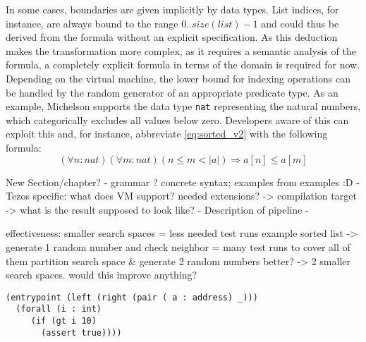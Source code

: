 In some cases, boundaries are given implicitly by data types. List indices, for instance, are always bound to the range $0.. size(list) - 1$ and could thus be derived from the formula without an explicit specification. As this deduction makes the transformation more complex, as it requires a semantic analysis of the formula, a completely explicit formula in terms of the domain is required for now. Depending on the virtual machine, the lower bound for indexing operations can be handled by the random generator of an appropriate predicate type. As an example, Michelson supports the data type \texttt{nat} representing the natural numbers, which categorically excludes all values below zero. Developers aware of this can exploit this and, for instance, abbreviate \eqref{eq:sorted_v2} with the following formula:
\begin{equation}\label{eq:sorted_v2_abbr}
	(\forall n : nat)(\forall m : nat) (n \le m < |a|) \Rightarrow a[n] \leq a[m]
\end{equation}


New Section/chapter? %
- grammar ? concrete syntax; examples from examples :D
- Tezos specific: what does VM support? needed extensions?
	-> compilation target -> what is the result supposed to look like?
- Description of pipeline
- 



effectiveness:
smaller search spaces = less needed test runs
example sorted list -> generate 1 random number and check neighbor = many test runs to cover all of them
partition search space \& generate 2 random numbers better? -> 2 smaller search spaces. would this improve anything?



\begin{lstlisting}[numbers=none, language=Assertion]
(entrypoint (left (right (pair ( a : address) _)))
  (forall (i : int)
     (if (gt i 10)
       (assert true))))
\end{lstlisting}